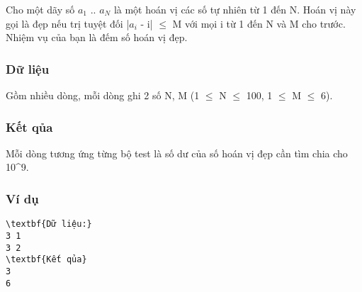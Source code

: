 



   Cho một dãy số $a_{1}$   .. $a_{N}$   là một hoán vị các số tự nhiên từ 1 đến N. Hoán vị này gọi là đẹp nếu trị tuyệt đối |$a_{i}$   - i|  $\le$  M với mọi i từ 1 đến N và M cho trước. Nhiệm vụ của bạn là đếm số hoán vị đẹp.  

\subsubsection{   Dữ liệu  }

   Gồm nhiều dòng, mỗi dòng ghi 2 số N, M (1 $\le$  N  $\le$  100, 1  $\le$  M  $\le$  6).  

\subsubsection{   Kết qủa  }

   Mỗi dòng tương ứng từng bộ test là số dư  của số hoán vị đẹp cần tìm chia cho 10^9.  

\subsubsection{   Ví dụ  }
\begin{verbatim}
\textbf{Dữ liệu:} 
3 1
3 2
\textbf{Kết qủa} 
3
6
\end{verbatim}
